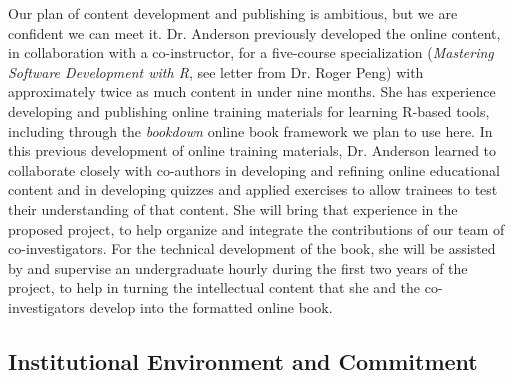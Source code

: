\documentclass[pdftex,english,11.5pt,parskip=half]{scrartcl}
\begin{document}
Our plan of content development and publishing is ambitious, but we are
confident we can meet it. Dr. Anderson previously developed the online content,
in collaboration with a co-instructor, for a five-course specialization (\textit{Mastering Software Development with R}, see letter from Dr. Roger Peng) with
approximately twice as much content in under nine months. She has experience
developing and publishing online training materials for learning R-based tools,
including through the \textit{bookdown} online book framework we plan to use
here. In this previous development of online training materials, Dr. Anderson
learned to collaborate closely with co-authors in developing and refining online educational
content and in developing quizzes and applied exercises to allow trainees to
test their understanding of that content. She will bring that experience in the
proposed project, to help organize and integrate the contributions of our team
of co-investigators. For the technical development of the book, she will be
assisted by and supervise an undergraduate hourly during the first two years of
the project, to help in turning the intellectual content that she and the
co-investigators develop into the formatted online book. 

\subsection{Institutional Environment and Commitment}
\end{document}
